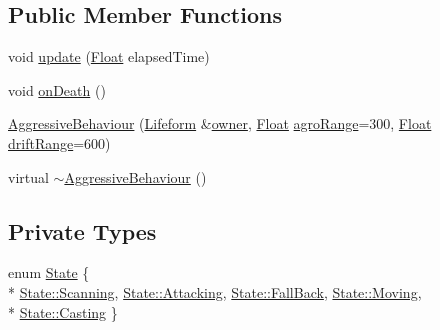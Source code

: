 \subsection*{Public Member Functions}
\begin{DoxyCompactItemize}
\item 
void \hyperlink{classZeta_1_1AggressiveBehaviour_a8303e71d7a3e283685573fc9c13e1640}{update} (\hyperlink{namespaceZeta_a1e0a1265f9b3bd3075fb0fabd39088ba}{Float} elapsed\+Time)
\item 
void \hyperlink{classZeta_1_1AggressiveBehaviour_a7ebb4cd0f618f9dd9e1e723e77aac292}{on\+Death} ()
\item 
\hyperlink{classZeta_1_1AggressiveBehaviour_a89c1244634a7f268ec45c6a04a244e59}{Aggressive\+Behaviour} (\hyperlink{classZeta_1_1Lifeform}{Lifeform} \&\hyperlink{classZeta_1_1Behaviour_ad32d56994e4e09e01ef86bcbb5c85e0a}{owner}, \hyperlink{namespaceZeta_a1e0a1265f9b3bd3075fb0fabd39088ba}{Float} \hyperlink{classZeta_1_1AggressiveBehaviour_a46ae846d179081d36af1daaeb21c0a55}{agro\+Range}=300, \hyperlink{namespaceZeta_a1e0a1265f9b3bd3075fb0fabd39088ba}{Float} \hyperlink{classZeta_1_1AggressiveBehaviour_af3f8203e1075c28d5141810ac07f1f5e}{drift\+Range}=600)
\item 
virtual \hyperlink{classZeta_1_1AggressiveBehaviour_a13d12742f4cca79e654b7e5c72a9cb50}{$\sim$\+Aggressive\+Behaviour} ()
\end{DoxyCompactItemize}
\subsection*{Private Types}
\begin{DoxyCompactItemize}
\item 
enum \hyperlink{classZeta_1_1AggressiveBehaviour_a768e2c9d0969879f4980d72220e11fbe}{State} \{ \\*
\hyperlink{classZeta_1_1AggressiveBehaviour_a768e2c9d0969879f4980d72220e11fbea495c55c275d09a00aaeb7482365ab300}{State\+::\+Scanning}, 
\hyperlink{classZeta_1_1AggressiveBehaviour_a768e2c9d0969879f4980d72220e11fbea8abd002ea36128383f3269de7e74039b}{State\+::\+Attacking}, 
\hyperlink{classZeta_1_1AggressiveBehaviour_a768e2c9d0969879f4980d72220e11fbead4e119b080e498be2b4712005e81f842}{State\+::\+Fall\+Back}, 
\hyperlink{classZeta_1_1AggressiveBehaviour_a768e2c9d0969879f4980d72220e11fbeadefe967ad0373b2274fc298f19125ca7}{State\+::\+Moving}, 
\\*
\hyperlink{classZeta_1_1AggressiveBehaviour_a768e2c9d0969879f4980d72220e11fbea86a59ad7ba2334ad7505f303d3f2ab6e}{State\+::\+Casting}
 \}
\end{DoxyCompactItemize}

